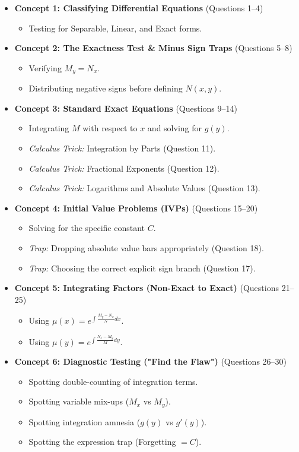 \documentclass[11pt]{article}
\begin{document}
\begin{itemize}
    \item \textbf{Concept 1: Classifying Differential Equations} (Questions 1--4)
    \begin{itemize}
        \item Testing for Separable, Linear, and Exact forms.
    \end{itemize}
    \item \textbf{Concept 2: The Exactness Test \& Minus Sign Traps} (Questions 5--8)
    \begin{itemize}
        \item Verifying $M_y = N_x$.
        \item Distributing negative signs before defining $N(x,y)$. 
    \end{itemize}
    \item \textbf{Concept 3: Standard Exact Equations} (Questions 9--14)
    \begin{itemize}
        \item Integrating $M$ with respect to $x$ and solving for $g(y)$.
        \item \textit{Calculus Trick:} Integration by Parts (Question 11).
        \item \textit{Calculus Trick:} Fractional Exponents (Question 12).
        \item \textit{Calculus Trick:} Logarithms and Absolute Values (Question 13).
    \end{itemize}
    \item \textbf{Concept 4: Initial Value Problems (IVPs)} (Questions 15--20)
    \begin{itemize}
        \item Solving for the specific constant $C$.
        \item \textit{Trap:} Dropping absolute value bars appropriately (Question 18).
        \item \textit{Trap:} Choosing the correct explicit sign branch (Question 17).
    \end{itemize}
    \item \textbf{Concept 5: Integrating Factors (Non-Exact to Exact)} (Questions 21--25)
    \begin{itemize}
        \item Using $\mu(x) = e^{\int \frac{M_y - N_x}{N} dx}$.
        \item Using $\mu(y) = e^{\int \frac{N_x - M_y}{M} dy}$.
    \end{itemize}
    \item \textbf{Concept 6: Diagnostic Testing ("Find the Flaw")} (Questions 26--30)
    \begin{itemize}
        \item Spotting double-counting of integration terms.
        \item Spotting variable mix-ups ($M_x$ vs $M_y$).
        \item Spotting integration amnesia ($g(y)$ vs $g'(y)$).
        \item Spotting the expression trap (Forgetting $= C$).
    \end{itemize}
\end{itemize}
\end{document}
